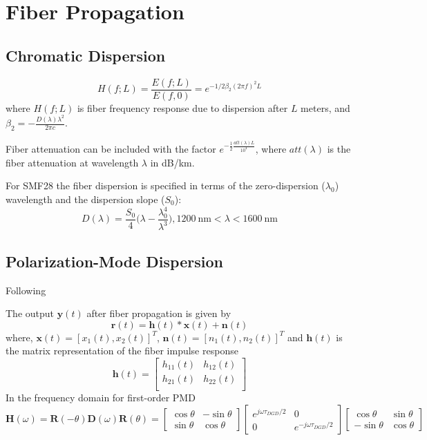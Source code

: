 \documentclass[a4paper]{article}
\begin{document}
\section{Fiber Propagation}
\subsection{Chromatic Dispersion}
\begin{equation}
H(f; L) = \frac{E(f; L)}{E(f, 0)} = e^{-1/2\beta_2(2\pi f)^2L}
\end{equation}
where $H(f; L)$ is fiber frequency response due to dispersion after $L$ meters, and $\beta_2 = -\frac{D(\lambda)\lambda^2}{2\pi c}$. 

Fiber attenuation can be included with the factor $e^{-\frac{1}{2}\frac{att(\lambda)L}{10^4}}$, where $att(\lambda)$ is the fiber attenuation at wavelength $\lambda$ in dB/km.

For SMF28 the fiber dispersion is specified in terms of the zero-dispersion ($\lambda_0$) wavelength and the dispersion slope ($S_0$):
\begin{equation}
D(\lambda) = \frac{S_0}{4}\bigg(\lambda - \frac{\lambda_0^4}{\lambda^3}\bigg), 1200~\text{nm} < \lambda < 1600~\text{nm}
\end{equation}

\subsection{Polarization-Mode Dispersion}
Following \cite{Ip2008}

The output $\bm{y}(t)$ after fiber propagation is given by
\begin{equation}
\bm{r}(t) = \bm{h}(t)\ast \bm{x}(t) + \bm{n}(t)
\end{equation}
where, $\bm{x}(t) = [x_1(t), x_2(t)]^T$, $\bm{n}(t) = [n_1(t), n_2(t)]^T$ and $\bm{h}(t)$ is the matrix representation of the fiber impulse response
\begin{equation}
\bm{h}(t) = \begin{bmatrix}
h_{11}(t) & h_{12}(t) \\
h_{21}(t) & h_{22}(t) \\
\end{bmatrix}
\end{equation}
In the frequency domain for first-order PMD
\begin{equation}
\bm{H}(\omega) = \bm{R}(-\theta)\bm{D}(\omega)\bm{R}(\theta)=\begin{bmatrix}
\cos\theta & -\sin\theta \\
\sin\theta & \cos\theta
\end{bmatrix}\begin{bmatrix}
e^{j\omega\tau_{DGD}/2} & 0 \\
0 & e^{-j\omega\tau_{DGD}/2}
\end{bmatrix}\begin{bmatrix}
\cos\theta & \sin\theta \\
-\sin\theta & \cos\theta
\end{bmatrix}
\end{equation}
\end{document}
